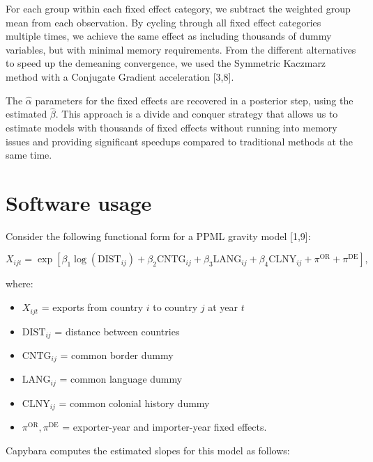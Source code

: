 \documentclass[
  10pt,
  letterpaper,
]{article}
\providecommand{\tightlist}{%
  \setlength{\itemsep}{0pt}\setlength{\parskip}{0pt}}
\begin{document}
For each group within each fixed effect category, we subtract the
weighted group mean from each observation. By cycling through all fixed
effect categories multiple times, we achieve the same effect as
including thousands of dummy variables, but with minimal memory
requirements. From the different alternatives to speed up the demeaning
convergence, we used the Symmetric Kaczmarz method with a Conjugate
Gradient acceleration {[}3,8{]}.

The \(\hat{\alpha}\) parameters for the fixed effects are recovered in a
posterior step, using the estimated \(\hat{\beta}\). This approach is a
divide and conquer strategy that allows us to estimate models with
thousands of fixed effects without running into memory issues and
providing significant speedups compared to traditional methods at the
same time.

\section{Software usage}\label{software-usage}

Consider the following functional form for a PPML gravity model
{[}1,9{]}:

\[X_{ijt} = \exp\left[\beta_1 \log(\text{DIST}_{ij}) + \beta_2 \text{CNTG}_{ij} + \beta_3 \text{LANG}_{ij} + \beta_4 \text{CLNY}_{ij} + \pi^{\text{OR}} + \pi^{\text{DE}}\right],\]

where:

\begin{itemize}
\tightlist
\item
  \(X_{ijt}\) = exports from country \(i\) to country \(j\) at year
  \(t\)
\item
  \(\text{DIST}_{ij}\) = distance between countries
\item
  \(\text{CNTG}_{ij}\) = common border dummy
\item
  \(\text{LANG}_{ij}\) = common language dummy
\item
  \(\text{CLNY}_{ij}\) = common colonial history dummy
\item
  \(\pi^{\text{OR}}, \pi^{\text{DE}}\) = exporter-year and importer-year
  fixed effects.
\end{itemize}

Capybara computes the estimated slopes for this model as follows:
\end{document}
